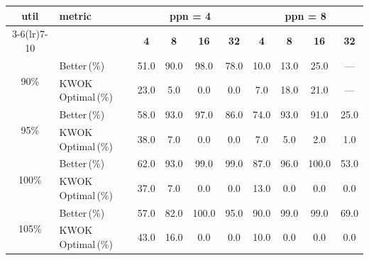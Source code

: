 \begin{tabular}{@{}c l *{8}{c}@{}}
\toprule
\multirow{2}{*}{\textbf{util}} & \multirow{2}{*}{\textbf{metric}} &\multicolumn{4}{c}{\textbf{ppn = 4}} & \multicolumn{4}{c}{\textbf{ppn = 8}}\\
\cmidrule(lr){3-6}\cmidrule(lr){7-10}
 &  & \textbf{4} & \textbf{8} & \textbf{16} & \textbf{32} & \textbf{4} & \textbf{8} & \textbf{16} & \textbf{32}\\
\midrule
\multirow{2}{*}{90\%}
& Better\,(\%) & 51.0 & 90.0 & 98.0 & 78.0 & 10.0 & 13.0 & 25.0 & \multicolumn{1}{c}{—} \\
& KWOK\,Optimal\,(\%) & 23.0 & 5.0 & 0.0 & 0.0 & 7.0 & 18.0 & 21.0 & \multicolumn{1}{c}{—} \\
\midrule
\multirow{2}{*}{95\%}
& Better\,(\%) & 58.0 & 93.0 & 97.0 & 86.0 & 74.0 & 93.0 & 91.0 & 25.0 \\
& KWOK\,Optimal\,(\%) & 38.0 & 7.0 & 0.0 & 0.0 & 7.0 & 5.0 & 2.0 & 1.0 \\
\midrule
\multirow{2}{*}{100\%}
& Better\,(\%) & 62.0 & 93.0 & 99.0 & 99.0 & 87.0 & 96.0 & 100.0 & 53.0 \\
& KWOK\,Optimal\,(\%) & 37.0 & 7.0 & 0.0 & 0.0 & 13.0 & 0.0 & 0.0 & 0.0 \\
\midrule
\multirow{2}{*}{105\%}
& Better\,(\%) & 57.0 & 82.0 & 100.0 & 95.0 & 90.0 & 99.0 & 99.0 & 69.0 \\
& KWOK\,Optimal\,(\%) & 43.0 & 16.0 & 0.0 & 0.0 & 10.0 & 0.0 & 0.0 & 0.0 \\
\bottomrule
\end{tabular}
